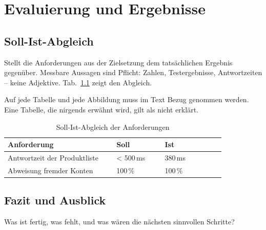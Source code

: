 \chapter{Evaluierung und Ergebnisse}
\abschnittsautor{\alleautoren}

\section{Soll-Ist-Abgleich}

Stellt die Anforderungen aus der Zielsetzung dem tatsächlichen Ergebnis
gegenüber. Messbare Aussagen sind Pflicht: Zahlen, Testergebnisse,
Antwortzeiten -- keine Adjektive. Tab.~\ref{tab:sollist} zeigt den Abgleich.

Auf jede Tabelle und jede Abbildung muss im Text Bezug genommen werden. Eine
Tabelle, die nirgends erwähnt wird, gilt als nicht erklärt.

\begin{table}[htbp]
  \caption{Soll-Ist-Abgleich der Anforderungen}
  \label{tab:sollist}
  \centering
  \begin{tabular}{@{}p{0.45\linewidth}p{0.2\linewidth}p{0.25\linewidth}@{}}
    \toprule
    \bfseries Anforderung & \bfseries Soll & \bfseries Ist \\
    \midrule
    Antwortzeit der Produktliste & < 500\,ms & 380\,ms \\
    Abweisung fremder Konten     & 100\,\%   & 100\,\% \\
    \bottomrule
  \end{tabular}
\end{table}

\section{Fazit und Ausblick}

Was ist fertig, was fehlt, und was wären die nächsten sinnvollen Schritte?
